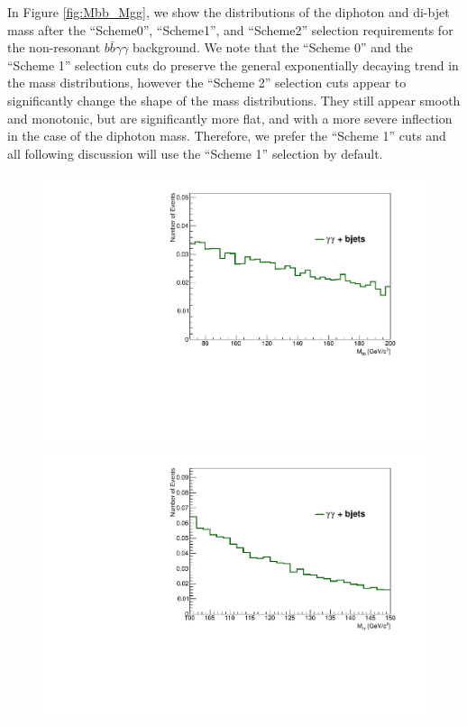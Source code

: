 \documentclass{cmspaper}
\begin{document}
In Figure \ref{fig:Mbb_Mgg}, we show the distributions of the diphoton and di-bjet mass after the 
``Scheme0'', ``Scheme1'', and ``Scheme2'' selection requirements for the non-resonant 
$b\bar{b}\gamma\gamma$ background. We note that the ``Scheme 0'' and the ``Scheme 1'' selection 
cuts do preserve the general exponentially decaying trend in the mass distributions, 
however the ``Scheme 2''  selection cuts appear to significantly change the shape of the 
mass distributions. They still appear smooth and monotonic, but are significantly more flat,
and with a more severe inflection in the case of the diphoton mass. Therefore, we prefer
the ``Scheme 1'' cuts and all following discussion will use the ``Scheme 1'' selection
by default. 

\begin{figure}[h]
\centering
\includegraphics[scale=0.35, angle=0]{figures/MassBB_s0.pdf}	
\includegraphics[scale=0.35, angle=0]{figures/MassGG_s0.pdf}	

\end{figure}
\end{document}

